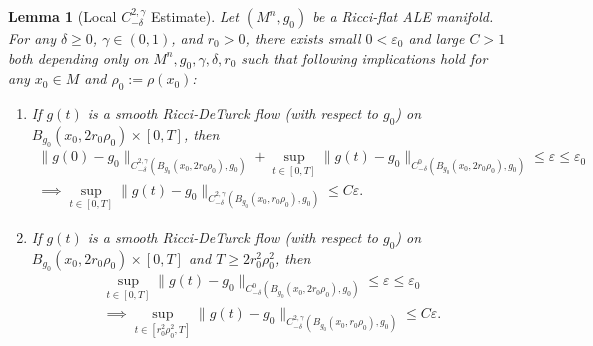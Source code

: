 \documentclass[12pt]{amsart}
\renewcommand{\1}{{\mathbf 1}}
\newcommand{\eps}{{\varepsilon}}
\newtheorem{lemma}[thm]{Lemma}
\theoremstyle{others}
\numberwithin{equation}{section}
\begin{document}
\begin{lemma}[Local $C^{2, \gamma}_{-\delta}$ Estimate]\label{lemma:localC2gamma-deltaestimate}
    Let $(M^n, g_0)$ be a Ricci-flat ALE manifold.
    For any $\delta \geq 0$, $\gamma \in (0,1)$, and $r_0 > 0$,
    there exists small $0 < \eps_0$ and large $C>1$ 
    both depending only on $M^n, g_0, \gamma, \delta, r_0$ such that following implications hold for any $x_0 \in M$ and $\rho_0 := \rho(x_0)$:
    \begin{enumerate}
        \item \label{lem local C2gamma-delta est, item global in time}
        If $g(t)$ is a smooth Ricci-DeTurck flow (with respect to $g_0$) on $B_{g_0}(x_0, 2r_0 \rho_0) \times [0 , T]$, then 
        \begin{multline*}
            \| g(0) - g_0 \|_{C^{2, \gamma}_{-\delta}(B_{g_0}(x_0, 2 r_0 \rho_0), g_0) } + \sup_{t \in [0, T]} \| g(t) - g_0 \|_{C^0_{-\delta}(B_{g_0}(x_0, 2 r_0 \rho_0), g_0)} \le \eps \leq \eps_0 \\
            \implies 
            \sup_{t \in [0,T]} \| g(t) - g_0 \|_{C^{2, \gamma}_{-\delta}(B_{g_0}(x_0,  r_0 \rho_0), g_0)}
            \le C \eps. %
        \end{multline*}
        
        \item \label{lem local C2gamma-delta est, item local in time}
        If $g(t)$ is a smooth Ricci-DeTurck flow (with respect to $g_0$) on $B_{g_0}(x_0, 2r_0 \rho_0) \times [0 , T]$ and $T \ge 2 r_0^2 \rho_0^2$, then 
        \begin{multline*}
            \sup_{t \in [0, T]} \| g(t) - g_0 \|_{C^0_{-\delta}(B_{g_0}(x_0, 2 r_0 \rho_0), g_0)} \le \eps \leq \eps_0 \\
            \implies 
            \sup_{t \in [r_0^2 \rho_0^2,T]} \| g(t) - g_0 \|_{C^{2, \gamma}_{-\delta}(B_{g_0}(x_0,  r_0 \rho_0), g_0)}
            \le C \eps. %
        \end{multline*}
    \end{enumerate}
\end{lemma}
\end{document}
